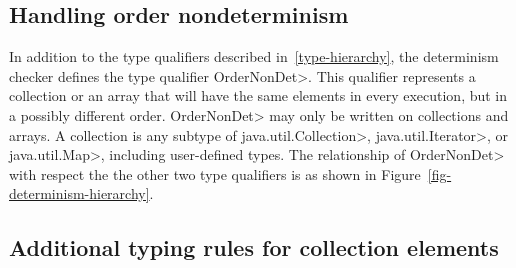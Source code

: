 \subsection{Handling order nondeterminism}
In addition to the type qualifiers described in~\ref{type-hierarchy}, the determinism checker 
defines the type qualifier \<OrderNonDet>. This qualifier represents
a collection or an array that will have the same elements in every execution, but in a
possibly different order.  \<OrderNonDet> may only be written on
collections and arrays.
A collection is any subtype of \<java.util.Collection>,
\<java.util.Iterator>, or \<java.util.Map>, including user-defined types. The relationship
of \<OrderNonDet> with respect the the other two type qualifiers is  as shown in Figure~\ref{fig-determinism-hierarchy}.

\subsection{Additional typing rules for collection elements}\label{collection-rules}

